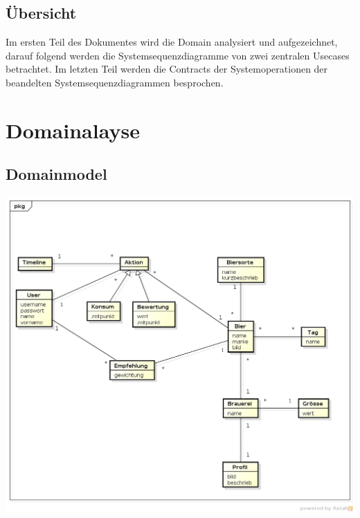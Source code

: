 \documentclass[10pt,a4paper]{scrartcl}
\begin{document}
\subsection{Übersicht}
Im ersten Teil des Dokumentes wird die Domain analysiert und aufgezeichnet, darauf folgend werden die Systemsequenzdiagramme von zwei zentralen Usecases betrachtet. Im letzten Teil werden die Contracts der Systemoperationen der beandelten Systemsequenzdiagrammen besprochen.


\section{Domainalayse}
\subsection{Domainmodel}
\includegraphics[width=\textwidth]{domain_model_bieridee.png} 
\end{document}
